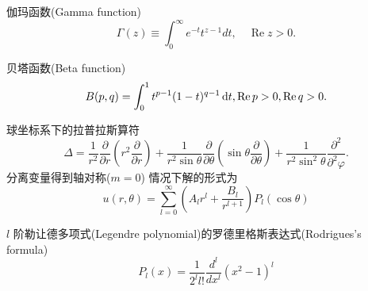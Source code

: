 \documentclass{njustexam}
\begin{document}
伽玛函数(Gamma function)
\[
  \Gamma(z) \equiv \int_{0}^{\infty} e^{-t} t^{z-1} d t,  \quad \operatorname{Re} z>0 . 
\]
\bigskip

贝塔函数(Beta function)
\[
    B(p,  q) = \int_0^1 t^{p -1} (1-t)^{q-1} \mathop{}\!\mathrm{d} t,  \operatorname{Re} p> 0,  \operatorname{Re} q >0. 
    \label{eq:beta_def1}
\]
\bigskip



球坐标系下的拉普拉斯算符
\[
 \Delta = \frac{1}{r^2} \frac{\partial}{\partial r} \left( r^2 \frac{\partial }{\partial r} \right)
  + \frac{1}{r^2\sin \theta} \frac{\partial}{\partial \theta} \left( \sin\theta \frac{\partial}{\partial \theta} \right)
  + \frac{1}{r^2\sin^2 \theta} \frac{\partial^2}{\partial^2 \varphi} .
\]
分离变量得到轴对称($m=0$)
情况下解的形式为
\[
  u(r,  \theta) = \sum_{l=0}^{\infty} \left( A_l r^l + \frac{B_l}{r^{l+1}} \right) P_{l} (\cos \theta)
\]

\bigskip

$l$ 阶勒让德多项式(Legendre polynomial)的罗德里格斯表达式(Rodrigues's formula) 
$$P_l(x)=\frac{1}{2^l l !} \frac{d^l}{d x^l}\left(x^2-1\right)^l$$
\end{document}
